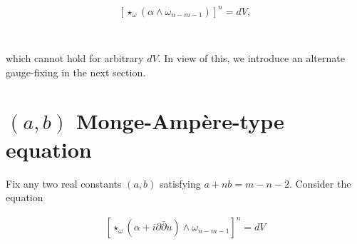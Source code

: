 \documentclass[11pt,letterpaper]{amsart}
\newcommand{\pbp}{\partial \bar{\partial}}
\newtheorem{proposition}[theorem]{Proposition}
\numberwithin{equation}{section}
\begin{document}
$$ [\star_{\omega}(\alpha\wedge \omega_{n-m-1})]^n = dV,$$


\

\noindent which cannot hold for arbitrary $dV$. In view of this, we introduce an alternate gauge-fixing in the next section.















\section{$(a,b)$ Monge-Amp\`ere-type equation}\label{section3}

\bigskip


 Fix any two real constants $(a,b)$ satisfying $a+ nb = m-n-2$. Consider the equation

\begin{equation} \label{(n-1)-MAeqn}
    \begin{aligned}
        \left[\star_{\omega}(\alpha + i\pbp u) \wedge \omega_{n-m-1}\right]^n = dV
    \end{aligned}
\end{equation}
\end{document}
